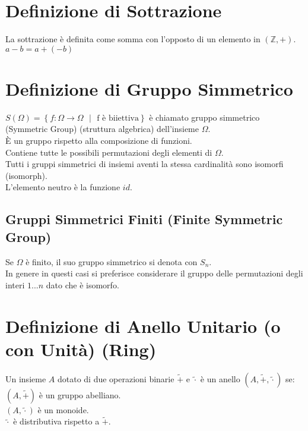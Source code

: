 \documentclass[a4paper, twoside, italian, 11pt]{book}
\newcommand{\braces}[1] {\left\{#1\right\}}
\newcommand{\Z}{\mathbb{Z}}
\begin{document}
\section{Definizione di Sottrazione}

La sottrazione è definita come somma con l'opposto di un elemento in $(\Z, +)$. \\

$a - b = a + (-b)$


\section{Definizione di Gruppo Simmetrico}

$S(\Omega) = \braces{f : \Omega \rightarrow \Omega \text{ $|$ } \text{f è biiettiva}}$ è chiamato gruppo simmetrico (Symmetric Group) (struttura algebrica) dell'insieme $\Omega$. \\

\noindent
È un gruppo rispetto alla composizione di funzioni. \\
Contiene tutte le possibili permutazioni degli elementi di $\Omega$. \\
Tutti i gruppi simmetrici di insiemi aventi la stessa cardinalità sono isomorfi (isomorph). \\
L'elemento neutro è la funzione $id$.


\subsection{Gruppi Simmetrici Finiti (Finite Symmetric Group)}

Se $\Omega$ è finito, il suo gruppo simmetrico si denota con $S_n$. \\
In genere in questi casi si preferisce considerare il gruppo delle permutazioni degli interi $1...n$ dato che è isomorfo.


\section{Definizione di Anello Unitario (o con Unità) (Ring)}

Un insieme $A$ dotato di due operazioni binarie $\tilde{+}$ e $\tilde{\cdot}$ è un anello $(A, \tilde{+}, \tilde{\cdot})$ se: \\

$(A, \tilde{+})$ è un gruppo abelliano. \\
\indent
$(A, \tilde{\cdot})$ è un monoide. \\
\indent
$\tilde{\cdot}$ è distributiva rispetto a $\tilde{+}$.
\end{document}
